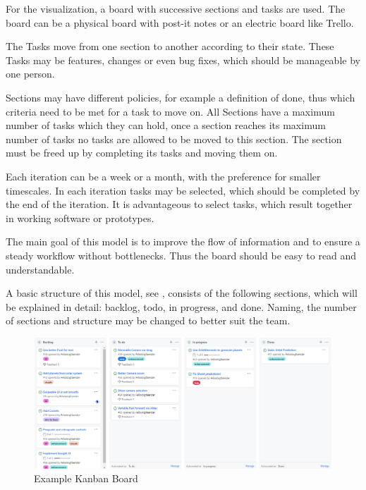 \documentclass[runningheads]{llncs}
\begin{document}
For the visualization, a board with successive sections and tasks are used. The board can be a physical board with post-it notes or an electric board like Trello. 

The Tasks move from one section to another according to their state. These Tasks may be features, changes or even bug fixes, which should be 
manageable by one person. 

Sections may have different policies, for example a definition of done, thus which criteria need to be met for a task to move on. All Sections
have a maximum number of tasks which they can hold, once a section reaches its maximum number of tasks no tasks are allowed to be moved to 
this section. The section must be freed up by completing its tasks and moving them on.

Each iteration can be a week or a month, with the preference for smaller timescales. In each iteration tasks may be selected, 
which should be completed by the end of the iteration. It is advantageous to select tasks, which result together in working software or prototypes.

The main goal of this model is to improve the flow of information and to ensure a steady workflow without bottlenecks. Thus the board should 
be easy to read and understandable. 

A basic structure of this model, see , consists of the following sections, which will be explained in detail: 
backlog, todo, in progress, and done. Naming, the number of sections and structure may be changed to better suit the team.

\begin{figure}[!htb]
  \centering
  \begin{minipage}{1\textwidth}
      \centering
      \includegraphics[width=1\textwidth]{Kanban.PNG}
      \caption{Example Kanban Board}
      \label{fig:kanban}
  \end{minipage}%
\end{figure}
\end{document}
